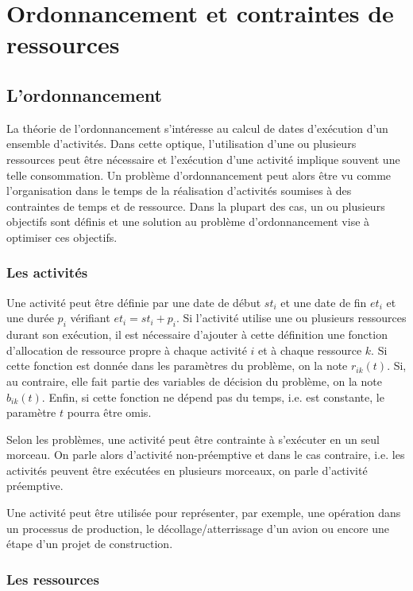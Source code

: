 \section{Ordonnancement et contraintes de ressources}
\label{sec:ordo}
\subsection{L'ordonnancement}

La théorie de l'ordonnancement s'intéresse au calcul de dates
d'exécution d'un ensemble d'activités. Dans cette optique,
l'utilisation d'une ou plusieurs ressources peut être nécessaire et
l'exécution d'une activité implique souvent une telle consommation. Un
problème d'ordonnancement peut alors être vu comme l'organisation dans
le temps de la réalisation d'activités soumises à des contraintes de
temps et de ressource. Dans la plupart des cas, un ou plusieurs
objectifs sont définis et une solution au problème d'ordonnancement 
vise à optimiser ces objectifs.
 
\subsubsection{Les activités}

Une activité peut être définie par une date de début $st_i$ et une date
de fin $et_i$ et une durée $p_i$ vérifiant $et_i=st_i+p_i$. Si
l'activité utilise une ou plusieurs ressources durant son exécution, il
est nécessaire d'ajouter à cette définition une fonction d'allocation
de ressource propre à chaque activité $i$ et à chaque
ressource $k$. Si cette fonction est donnée dans les paramètres du
problème, on la note $r_{ik}(t)$. Si, au contraire, elle fait partie
des variables de décision du problème, on la note $b_{ik}(t)$. Enfin,
si cette fonction ne dépend pas du temps, i.e. est constante, le
paramètre $t$ pourra être omis. 

Selon les problèmes, une activité peut être contrainte à s'exécuter en
un seul morceau. On parle alors d'activité non-préemptive et dans le
cas contraire, i.e. les activités peuvent être exécutées en plusieurs
morceaux, on parle d'activité préemptive.

Une activité peut être utilisée pour représenter, par exemple, une
opération dans un processus de production, le décollage/atterrissage
d'un avion ou encore une étape d'un projet de construction.

\subsubsection{Les ressources}

